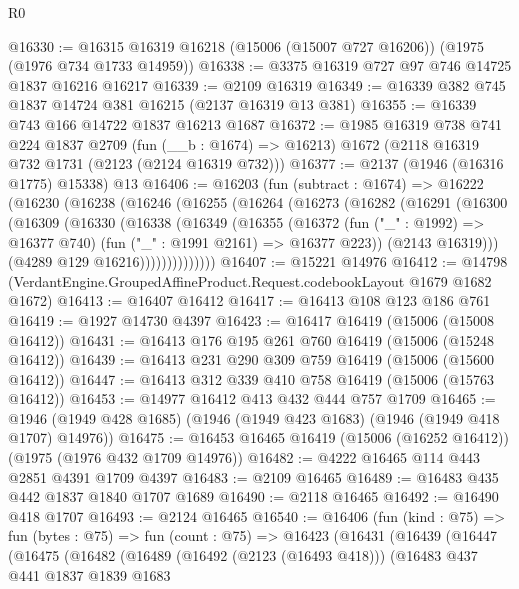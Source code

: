 \begin{lexlean}{R0}
\begin{coremodule}
@16330 := @16315 @16319 @16218 (@15006 (@15007 @727 @16206)) (@1975 (@1976 @734 @1733 @14959))
@16338 := @3375 @16319 @727 @97 @746 @14725 @1837 @16216 @16217
@16339 := @2109 @16319
@16349 := @16339 @382 @745 @1837 @14724 @381 @16215 (@2137 @16319 @13 @381)
@16355 := @16339 @743 @166 @14722 @1837 @16213 @1687
@16372 := @1985
    @16319
    @738
    @741
    @224
    @1837
    @2709
    (fun (__b : @1674) => @16213)
    @1672
    (@2118 @16319 @732 @1731 (@2123 (@2124 @16319 @732)))
@16377 := @2137 (@1946 (@16316 @1775) @15338) @13
@16406 := @16203
    (fun (subtract : @1674) =>
    @16222
      (@16230
        (@16238
          (@16246
            (@16255
              (@16264
                (@16273
                  (@16282
                    (@16291
                      (@16300
                        (@16309
                          (@16330
                            (@16338
                              (@16349
                                (@16355
                                  (@16372
                                    (fun ("_" : @1992) => @16377 @740)
                                    (fun ("_" : @1991 @2161) => @16377 @223))
                                  (@2143 @16319)))
                              (@4289 @129 @16216))))))))))))))
@16407 := @15221 @14976
@16412 := @14798 (VerdantEngine.GroupedAffineProduct.Request.codebookLayout @1679 @1682 @1672)
@16413 := @16407 @16412
@16417 := @16413 @108 @123 @186 @761
@16419 := @1927 @14730 @4397
@16423 := @16417 @16419 (@15006 (@15008 @16412))
@16431 := @16413 @176 @195 @261 @760 @16419 (@15006 (@15248 @16412))
@16439 := @16413 @231 @290 @309 @759 @16419 (@15006 (@15600 @16412))
@16447 := @16413 @312 @339 @410 @758 @16419 (@15006 (@15763 @16412))
@16453 := @14977 @16412 @413 @432 @444 @757 @1709
@16465 := @1946 (@1949 @428 @1685) (@1946 (@1949 @423 @1683) (@1946 (@1949 @418 @1707) @14976))
@16475 := @16453 @16465 @16419 (@15006 (@16252 @16412)) (@1975 (@1976 @432 @1709 @14976))
@16482 := @4222 @16465 @114 @443 @2851 @4391 @1709 @4397
@16483 := @2109 @16465
@16489 := @16483 @435 @442 @1837 @1840 @1707 @1689
@16490 := @2118 @16465
@16492 := @16490 @418 @1707
@16493 := @2124 @16465
@16540 := @16406
    (fun (kind : @75) =>
    fun (bytes : @75) =>
    fun (count : @75) =>
    @16423
      (@16431
        (@16439
          (@16447
            (@16475
              (@16482
                (@16489
                  (@16492 (@2123 (@16493 @418)))
                  (@16483
                    @437
                    @441
                    @1837
                    @1839
                    @1683

\end{coremodule}
\end{lexlean}
